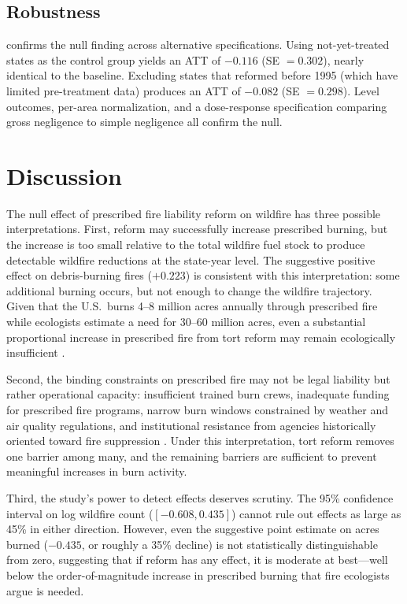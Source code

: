 \documentclass[12pt]{article}
\begin{document}


\subsection{Robustness}

 confirms the null finding across alternative specifications. Using not-yet-treated states as the control group yields an ATT of $-0.116$ (SE $= 0.302$), nearly identical to the baseline. Excluding states that reformed before 1995 (which have limited pre-treatment data) produces an ATT of $-0.082$ (SE $= 0.298$). Level outcomes, per-area normalization, and a dose-response specification comparing gross negligence to simple negligence all confirm the null.



\section{Discussion}

The null effect of prescribed fire liability reform on wildfire has three possible interpretations. First, reform may successfully increase prescribed burning, but the increase is too small relative to the total wildfire fuel stock to produce detectable wildfire reductions at the state-year level. The suggestive positive effect on debris-burning fires ($+0.223$) is consistent with this interpretation: some additional burning occurs, but not enough to change the wildfire trajectory. Given that the U.S.\ burns 4--8 million acres annually through prescribed fire while ecologists estimate a need for 30--60 million acres, even a substantial proportional increase in prescribed fire from tort reform may remain ecologically insufficient \citep{Kolden2019}.

Second, the binding constraints on prescribed fire may not be legal liability but rather operational capacity: insufficient trained burn crews, inadequate funding for prescribed fire programs, narrow burn windows constrained by weather and air quality regulations, and institutional resistance from agencies historically oriented toward fire suppression \citep{Schultz2019}. Under this interpretation, tort reform removes one barrier among many, and the remaining barriers are sufficient to prevent meaningful increases in burn activity.

Third, the study's power to detect effects deserves scrutiny. The 95\% confidence interval on log wildfire count ($[-0.608, 0.435]$) cannot rule out effects as large as 45\% in either direction. However, even the suggestive point estimate on acres burned ($-0.435$, or roughly a 35\% decline) is not statistically distinguishable from zero, suggesting that if reform has any effect, it is moderate at best---well below the order-of-magnitude increase in prescribed burning that fire ecologists argue is needed.
\end{document}

